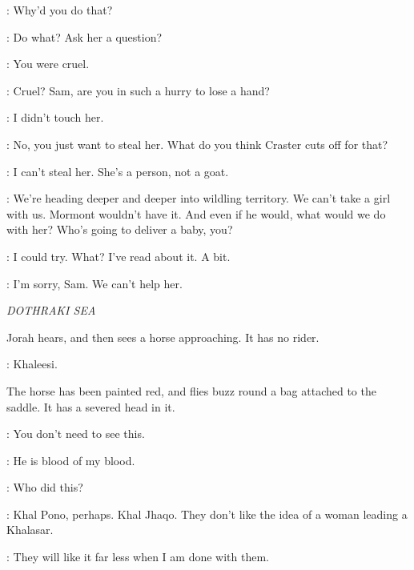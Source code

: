 \SAM: Why'd you do that?

\JON: Do what? Ask her a question?

\SAM: You were cruel.

\JON: Cruel? Sam, are you in such a hurry to lose a hand?

\SAM: I didn't touch her.

\JON: No, you just want to steal her. What do you think Craster cuts off for that?

\SAM: I can't steal her. She's a person, not a goat.

\JON: We're heading deeper and deeper into wildling territory. We can't take a girl with us. Mormont wouldn't have it. And even if he would, what would we do with her? Who's going to deliver a baby, you?

\SAM: I could try. What? I've read about it. A bit.

\JON: I'm sorry, Sam. We can't help her.



\scene

\textit{DOTHRAKI SEA}


\n Jorah hears, and then sees a horse approaching. It has no rider.

\JORAH: Khaleesi.


\n The horse has been painted red, and flies buzz round a bag attached
to the saddle. It has a severed head in it.

\JORAH: You don't need to see this.

\DAENERYS: He is blood of my blood.


\DAENERYS: Who did this?

\JORAH: Khal Pono, perhaps. Khal Jhaqo. They don't like the idea of a woman leading a Khalasar.

\DAENERYS: They will like it far less when I am done with them.


